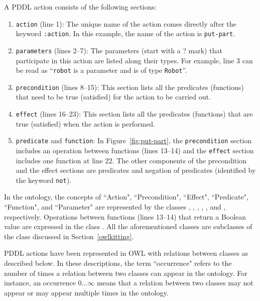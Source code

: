 A PDDL action consists of the following sections:
\begin{enumerate}
  \item \texttt{action} (line 1): The unique name of the action comes directly after the keyword \texttt{:action}. In this example, the name of the action is \texttt{put-part}.
  \item \texttt{parameters} (lines 2--7): The parameters (start with a ? mark) that participate in this action are listed along their types. For example, line 3 can be read as ``\texttt{robot} is a parameter and is of type \texttt{Robot}''.
  \item \texttt{precondition} (lines 8--15): This section lists all the predicates (functions) that need to be true (satisfied) for the action to be carried out.
  \item \texttt{effect} (lines 16--23): This section lists all the predicates (functions) that are true (satisfied) when the action is performed.
   \item \texttt{predicate} and \texttt{function}: In Figure~\ref{fig:put-part}, the \texttt{precondition} section includes an operation between functions (lines 13--14) and the \texttt{effect} section includes one function at line 22. The other components of the precondition and the effect sections are predicates and negation of predicates (identified by the keyword \texttt{not}).
\end{enumerate}

In the  ontology, the concepts of ``Action", ``Precondition", ``Effect", ``Predicate", ``Function", and ``Parameter" are represented by the classes , , , , , and , respectively. Operations between functions (lines 13--14) that return a Boolean value are expressed in the class . All the aforementioned classes are subclasses of the  class discussed in Section~\ref{owlkitting}.

PDDL actions have been represented in OWL with relations between classes as described below. In these descriptions, the term ``occurrence" refers to the number of times a relation between two classes can appear in the ontology. For instance, an occurrence $0\ldots\infty$ means that a relation between two classes may not appear or may appear multiple times in the ontology.

